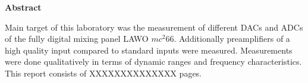 \documentclass[11pt]{report}
\begin{document}



\newpage
{}
\vspace*{2.2 cm}
{\Large
\noindent
{\bf Abstract}} \\
\vspace*{0.3 cm}

\noindent
Main target of this laboratory was the measurement of different DACs and ADCs of the fully digital mixing panel LAWO $mc^2 66$. Additionally preamplifiers of a high quality input compared to standard inputs were measured. Measurements were done qualitatively in terms of dynamic ranges and frequency characteristics.\\
This report consists of XXXXXXXXXXXXXX pages. 











\newpage
{}


\end{document}
